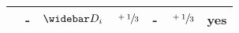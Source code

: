 \documentclass[../main.tex]{subfiles}
\begin{document}
\begin{table}[ht!]
\begin{tabular}{|l|c|c|c|c|c|c|}
                                             & -                                & \(\wbar{D}_i\)    & \(\sfrac{+1}{3}\) & -                       & \(\sfrac{+1}{3}\) & yes \\
    \hline
  \end{tabular}

\end{table}
\end{document}
